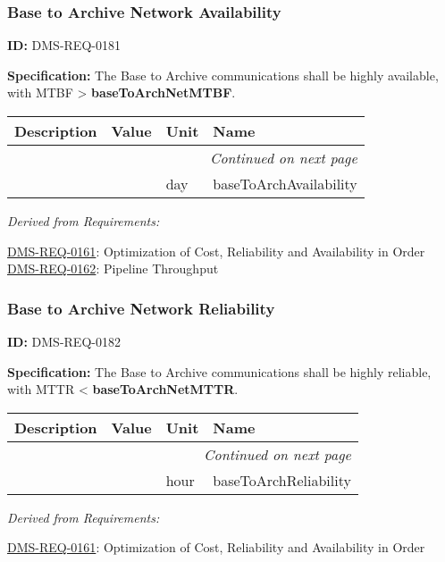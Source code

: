 \documentclass[SE,toc,lsstdraft]{lsstdoc}
\makeatletter
\newcommand{\paramname}[1]{\hspace{0pt}#1}
\newcommand{\unitname}[1]{\hspace{0pt}#1}
\newenvironment{parameters}[0]{%
\setlength\LTleft{0pt}
\setlength\LTright{\fill}
\begin{small}
\begin{longtable}[]{|p{0.5\textwidth}|l|p{0.6in}|p{1.74in}@{}|}

\hline \textbf{Description} & \textbf{Value} & \textbf{Unit} & \textbf{Name} \\ \hline
\endhead

\hline \multicolumn{4}{r}{\emph{Continued on next page}} \\
\endfoot

\hline\hline
\endlastfoot
}{%
\hline
\end{longtable}
\end{small}
}
\makeatother
\begin{document}
\subsubsection{Base to Archive Network Availability}

\label{DMS-REQ-0181}
\textbf{ID:} DMS-REQ-0181

\textbf{Specification: }The Base to Archive communications shall be highly available, with MTBF >  \textbf{baseToArchNetMTBF}.





\begin{parameters}

&

&
\unitname{%
day
}
&
\paramname{%
baseToArchAvailability
} \\\hline
\end{parameters}




\emph{Derived from Requirements:}

\hyperref[DMS-REQ-0161]{DMS-REQ-0161}:
Optimization of Cost, Reliability and Availability in Order \newline
\hyperref[DMS-REQ-0162]{DMS-REQ-0162}:
Pipeline Throughput \newline


\subsubsection{Base to Archive Network Reliability}

\label{DMS-REQ-0182}
\textbf{ID:} DMS-REQ-0182

\textbf{Specification:} The Base to Archive communications shall be highly reliable, with MTTR <  \textbf{baseToArchNetMTTR}.





\begin{parameters}

&

&
\unitname{%
hour
}
&
\paramname{%
baseToArchReliability
} \\\hline
\end{parameters}




\emph{Derived from Requirements:}

\hyperref[DMS-REQ-0161]{DMS-REQ-0161}:
Optimization of Cost, Reliability and Availability in Order \newline
\end{document}
